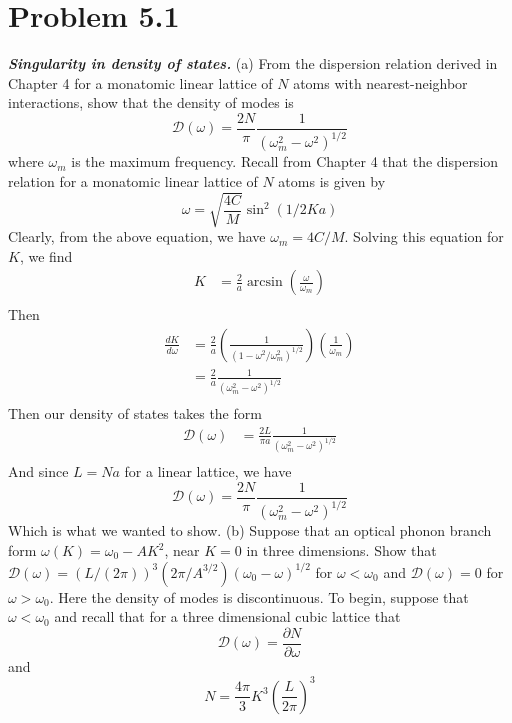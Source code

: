 \documentclass{article}
\begin{document}
\section*{Problem 5.1} \textbf{\textit{Singularity in density of states.}} (a) From the dispersion relation derived in Chapter 4 for a monatomic linear lattice of $N$ atoms with nearest-neighbor interactions, show that the density of modes is
\[\mathcal{D}(\omega) = \frac{2N}{\pi}\frac{1}{(\omega_m^2 - \omega^2)^{1/2}}\]
where $\omega_m$ is the maximum frequency.
\newline\newline
Recall from Chapter 4 that the dispersion relation for a monatomic linear lattice of $N$ atoms is given by
\[\omega = \sqrt{\frac{4C}{M}}\sin^2{(1/2Ka)}\]
Clearly, from the above equation, we have $\omega_m = 4C/M$. Solving this equation for $K$, we find
\begin{align*}
    K &= \frac{2}{a}\arcsin{\left(\frac{\omega}{\omega_m}\right)} \\
\end{align*}
Then
\begin{align*}
    \frac{dK}{d\omega} &= \frac{2}{a}\left(\frac{1}{(1 - \omega^2/\omega_m^2)^{1/2}}\right)\left(\frac{1}{\omega_m}\right) \\
    &= \frac{2}{a}\frac{1}{(\omega_m^2 - \omega^2)^{1/2}} \\
\end{align*}
Then our density of states takes the form
\begin{align*}
    \mathcal{D}(\omega) &= \frac{2L}{\pi a}\frac{1}{(\omega_m^2 - \omega^2)^{1/2}} \\
\end{align*}
And since $L = Na$ for a linear lattice, we have
\[\mathcal{D}(\omega) = \frac{2N}{\pi}\frac{1}{(\omega_m^2 - \omega^2)^{1/2}}\]
Which is what we wanted to show.
\newline\newline
(b) Suppose that an optical phonon branch form $\omega(K) = \omega_0 - AK^2$, near $K = 0$ in three dimensions. Show that $\mathcal{D}(\omega) = (L/(2\pi))^3(2\pi/A^{3/2})(\omega_0 - \omega)^{1/2}$ for $\omega < \omega_0$ and $\mathcal{D}(\omega) = 0$ for $\omega > \omega_0$. Here the density of modes is discontinuous.
\newline\newline
To begin, suppose that $\omega < \omega_0$ and recall that for a three dimensional cubic lattice that 
\[\mathcal{D}(\omega) = \frac{\partial N}{\partial \omega}\]
and 
\[N = \frac{4\pi}{3}K^3\left(\frac{L}{2\pi}\right)^3\]
\end{document}
